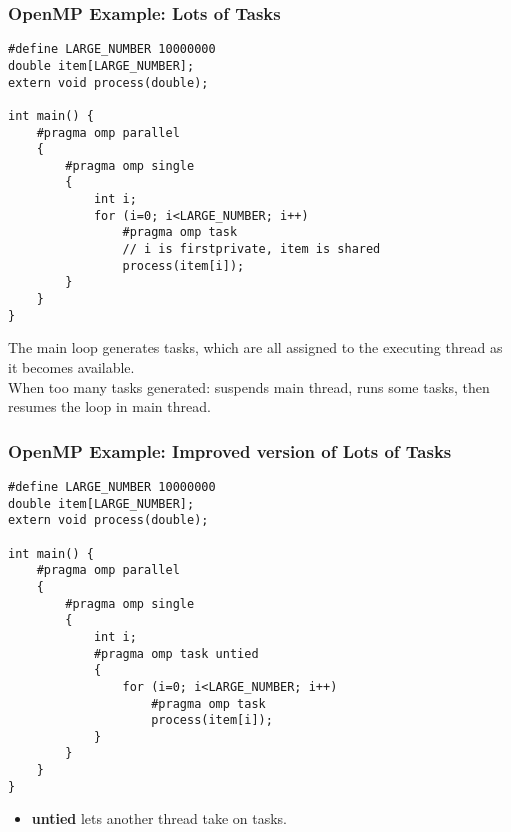 \begin{frame}[fragile]
  \frametitle{OpenMP Example: Lots of Tasks}

  
  \begin{lstlisting}
#define LARGE_NUMBER 10000000
double item[LARGE_NUMBER];
extern void process(double);

int main() {
    #pragma omp parallel
    {
        #pragma omp single
        {
            int i;
            for (i=0; i<LARGE_NUMBER; i++)
                #pragma omp task
                // i is firstprivate, item is shared
                process(item[i]);
        }
    }
}
  \end{lstlisting}


  The main loop generates tasks, which are all assigned to the executing thread as it becomes available.\\[1em]
  When too many tasks generated: suspends main thread, runs some tasks, then resumes the loop in main thread.
  
\end{frame}

\begin{frame}[fragile]
  \frametitle{OpenMP Example: Improved version of Lots of Tasks}

  
  \begin{lstlisting}
#define LARGE_NUMBER 10000000
double item[LARGE_NUMBER];
extern void process(double);

int main() {
    #pragma omp parallel
    {
        #pragma omp single
        {
            int i;
            #pragma omp task untied
            {
                for (i=0; i<LARGE_NUMBER; i++)
                    #pragma omp task
                    process(item[i]);
            }
        }
    }
}
  \end{lstlisting}
  
  \begin{itemize}
    \item {\bf untied} lets another thread take on tasks.
  \end{itemize}
  
\end{frame}

